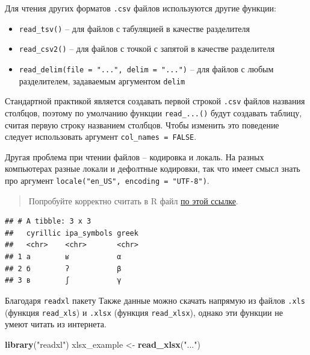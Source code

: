 \documentclass[]{book}
\newenvironment{Shaded}{\begin{snugshade}}{\end{snugshade}}
\newcommand{\KeywordTok}[1]{\textcolor[rgb]{0.13,0.29,0.53}{\textbf{#1}}}
\newcommand{\NormalTok}[1]{#1}
\newcommand{\StringTok}[1]{\textcolor[rgb]{0.31,0.60,0.02}{#1}}
\providecommand{\tightlist}{%
  \setlength{\itemsep}{0pt}\setlength{\parskip}{0pt}}
\begin{document}
Для чтения других форматов \texttt{.csv} файлов используются другие функции:

\begin{itemize}
\tightlist
\item
  \texttt{read\_tsv()} -- для файлов с табуляцией в качестве разделителя
\item
  \texttt{read\_csv2()} -- для файлов с точкой с запятой в качестве разделителя
\item
  \texttt{read\_delim(file\ =\ "...",\ delim\ =\ "...")} -- для файлов с любым разделителем, задаваемым аргументом \texttt{delim}
\end{itemize}

Стандартной практикой является создавать первой строкой \texttt{.csv} файлов названия столбцов, поэтому по умолчанию функции \texttt{read\_...()} будут создавать таблицу, считая первую строку названием столбцов. Чтобы изменить это поведение следует использовать аргумент \texttt{col\_names\ =\ FALSE}.

Другая проблема при чтении файлов -- кодировка и локаль. На разных компьютерах разные локали и дефолтные кодировки, так что имеет смысл знать про аргумент \texttt{locale("en\_US",\ encoding\ =\ "UTF-8")}.

\begin{quote}
Попробуйте корректно считать в R файл \href{https://raw.githubusercontent.com/agricolamz/DS_for_DH/master/data/scary_letters.csv}{по этой ссылке}.
\end{quote}

\begin{verbatim}
## # A tibble: 3 x 3
##   cyrillic ipa_symbols greek
##   <chr>    <chr>       <chr>
## 1 а        ʁ           α    
## 2 б        ʔ           β    
## 3 в        ʃ           γ
\end{verbatim}

Благодаря \texttt{readxl} пакету Также данные можно скачать напрямую из файлов \texttt{.xls} (функция \texttt{read\_xls}) и \texttt{.xlsx} (функция \texttt{read\_xlsx}), однако эти функции не умеют читать из интернета.

\begin{Shaded}
\begin{Highlighting}[]
\KeywordTok{library}\NormalTok{(}\StringTok{"readxl"}\NormalTok{)}
\NormalTok{xlsx_example <-}\StringTok{ }\KeywordTok{read_xlsx}\NormalTok{(}\StringTok{"..."}\NormalTok{)}
\end{Highlighting}
\end{Shaded}
\end{document}
